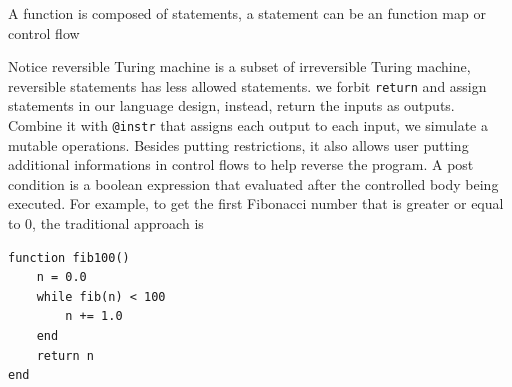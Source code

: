 \documentclass{article}
\newcommand{\<}{\langle}
\renewcommand{\>}{\rangle}
\newcommand{\ra}[1]{\renewcommand{\arraystretch}{#1}}
\begin{document}
A function is composed of statements, a statement can be an function map or control flow
\begin{table}[h!]\centering
\begin{minipage}{\columnwidth}
\ra{1.3}
    \caption{A collection of reversible statements.}\label{tbl:revstatements}
\end{minipage}
\end{table}
Notice reversible Turing machine is a subset of irreversible Turing machine,
reversible statements has less allowed statements.
we forbit \texttt{return} and assign statements in our language design, instead, return the inputs as outputs.
Combine it with \texttt{@instr} that assigns each output to each input, we simulate a mutable operations.
Besides putting restrictions, it also allows user putting additional informations in control flows to help reverse the program.
A post condition is a boolean expression that evaluated after the controlled body being executed.
For example, to get the first Fibonacci number that is greater or equal to 0, the traditional approach is
\begin{minipage}{.44\textwidth}
\begin{lstlisting}
function fib100()
    n = 0.0
    while fib(n) < 100
        n += 1.0
    end
    return n
end
\end{lstlisting}
\end{minipage}
\end{document}
